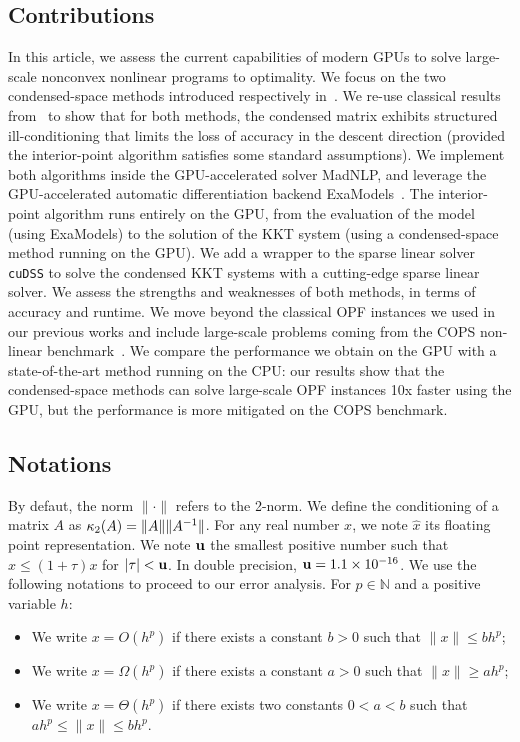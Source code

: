 \subsection{Contributions}
In this article, we assess the current capabilities of modern GPUs
to solve large-scale nonconvex nonlinear programs to optimality.
We focus on the two condensed-space methods
introduced respectively in~\cite{regev2023hykkt,shin2023accelerating}.
We re-use classical results from~\cite{wright1998ill} to show
that for both methods, the condensed matrix exhibits
structured ill-conditioning that limits the loss of accuracy in
the descent direction (provided the interior-point algorithm satisfies
some standard assumptions).
We implement both algorithms inside the GPU-accelerated solver MadNLP,
and leverage the GPU-accelerated automatic differentiation
backend ExaModels~\cite{shin2023accelerating}.
The interior-point algorithm runs entirely on the GPU, from
the evaluation of the model (using ExaModels) to the solution of
the KKT system (using a condensed-space method running on the GPU).
We add a wrapper to the sparse linear solver {\tt cuDSS} to solve
the condensed KKT systems with a cutting-edge sparse linear solver.
We assess the strengths
and weaknesses of both methods, in terms of accuracy and runtime.
We move beyond the classical OPF instances we used in our previous works
and include large-scale problems coming from the COPS
non-linear benchmark~\cite{dolan2004benchmarking}.
We compare the performance we obtain on the GPU with a state-of-the-art
method running on the CPU: our results show that the condensed-space
methods can solve large-scale OPF instances 10x faster using the GPU,
but the performance is more mitigated on the COPS benchmark.

\subsection{Notations}
By defaut, the norm $\|\cdot\|$ refers to the 2-norm.
We define the conditioning of a matrix $A$ as
$\kappa_2(A) = \| A \| \|A^{-1} \|$.
For any real number $x$, we note $\widehat{x}$ its floating
point representation.
We note $\mathbf{u}$ the smallest positive number such that
$\widehat{x} \leq (1 + \tau) x$ for $|\tau| < \mathbf{u}$.
In double precision, $\mathbf{u} = 1.1 \times 10^{-16}$.
We use the following notations to proceed to our error analysis.
For $p \in \mathbb{N}$ and a positive variable $h$:
\begin{itemize}
  \item We write $x = O(h^p)$ if there exists a constant $b > 0$
    such that $\| x \| \leq b h^p$;
  \item We write $x = \Omega(h^p)$ if there exists a constant $a > 0$
    such that $\| x \| \geq a h^p$;
  \item We write $x = \Theta(h^p)$ if there exists two constants $0 < a < b$
    such that $a h^p \leq \| x \| \leq b h^p$.
\end{itemize}


